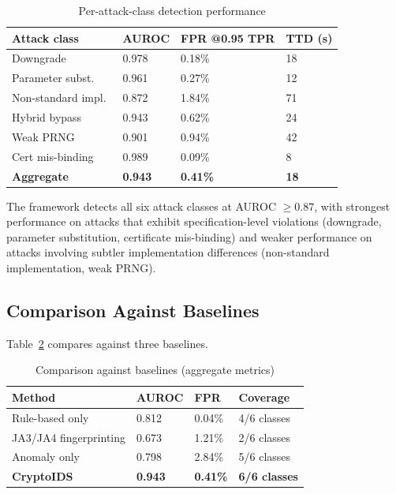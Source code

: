 \documentclass[sigconf,nonacm]{acmart}
\begin{document}
\begin{table}[h]
\caption{Per-attack-class detection performance}
\label{tab:perclass}
\small
\begin{tabularx}{\columnwidth}{@{}p{3.0cm}X X X@{}}
\toprule
\textbf{Attack class} & \textbf{AUROC} & \textbf{FPR @0.95 TPR} & \textbf{TTD (s)} \\
\midrule
Downgrade           & 0.978 & 0.18\% & 18 \\
Parameter subst.\   & 0.961 & 0.27\% & 12 \\
Non-standard impl.\ & 0.872 & 1.84\% & 71 \\
Hybrid bypass       & 0.943 & 0.62\% & 24 \\
Weak PRNG           & 0.901 & 0.94\% & 42 \\
Cert mis-binding    & 0.989 & 0.09\% & 8  \\
\midrule
\textbf{Aggregate}  & \textbf{0.943} & \textbf{0.41\%} & \textbf{18} \\
\bottomrule
\end{tabularx}
\end{table}

The framework detects all six attack classes at AUROC $\geq 0.87$,
with strongest performance on attacks that exhibit specification-level
violations (downgrade, parameter substitution, certificate
mis-binding) and weaker performance on attacks involving subtler
implementation differences (non-standard implementation, weak PRNG).

\subsection{Comparison Against Baselines}

Table~\ref{tab:baselines} compares against three baselines.

\begin{table}[h]
\caption{Comparison against baselines (aggregate metrics)}
\label{tab:baselines}
\small
\begin{tabularx}{\columnwidth}{@{}p{2.6cm}X X X@{}}
\toprule
\textbf{Method} & \textbf{AUROC} & \textbf{FPR} & \textbf{Coverage} \\
\midrule
Rule-based only          & 0.812 & 0.04\% & 4/6 classes \\
JA3/JA4 fingerprinting   & 0.673 & 1.21\% & 2/6 classes \\
Anomaly only             & 0.798 & 2.84\% & 5/6 classes \\
\textbf{CryptoIDS}       & \textbf{0.943} & \textbf{0.41\%} & \textbf{6/6 classes} \\
\bottomrule
\end{tabularx}
\end{table}
\end{document}
